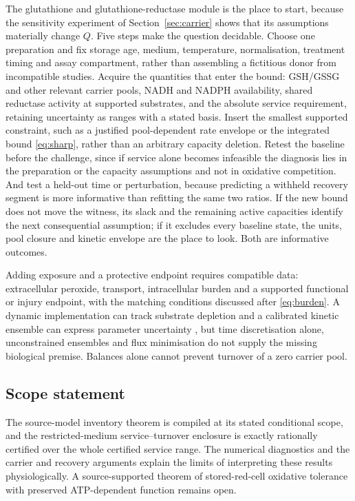 \documentclass[11pt,a4paper]{article}
\theoremstyle{plain}
\theoremstyle{definition}
\theoremstyle{remark}
\begin{document}
The glutathione and glutathione-reductase module is the place to start, because
the sensitivity experiment of Section~\ref{sec:carrier} shows that its
assumptions materially change $Q$. Five steps make the question decidable.
Choose one preparation and fix storage age, medium, temperature, normalisation,
treatment timing and assay compartment, rather than assembling a fictitious
donor from incompatible studies. Acquire the quantities that enter the bound:
GSH/GSSG and other relevant carrier pools, NADH and NADPH availability, shared
reductase activity at supported substrates, and the absolute service
requirement, retaining uncertainty as ranges with a stated basis. Insert the
smallest supported constraint, such as a justified pool-dependent rate envelope
or the integrated bound \eqref{eq:sharp}, rather than an arbitrary capacity
deletion. Retest the baseline before the challenge, since if service alone
becomes infeasible the diagnosis lies in the preparation or the capacity
assumptions and not in oxidative competition. And test a held-out time or
perturbation, because predicting a withheld recovery segment is more
informative than refitting the same two ratios. If the new bound does not move
the witness, its slack and the remaining active capacities identify the next
consequential assumption; if it excludes every baseline state, the units, pool
closure and kinetic envelope are the place to look. Both are informative
outcomes.

Adding exposure and a protective endpoint requires compatible data:
extracellular peroxide, transport, intracellular burden and a supported
functional or injury endpoint, with the matching conditions discussed after
\eqref{eq:burden}. A dynamic implementation can track substrate depletion
\citep{mahadevan2002} and a calibrated kinetic ensemble can express parameter
uncertainty \citep{bordbar2015}, but time discretisation alone, unconstrained
ensembles and flux minimisation do not supply the missing biological premise.
Balances alone cannot prevent turnover of a zero carrier pool.

\subsection{Scope statement}
The source-model inventory theorem is compiled at its stated conditional scope,
and the restricted-medium service--turnover enclosure is exactly rationally
certified over the whole certified service range. The numerical diagnostics and
the carrier and recovery arguments explain the limits of interpreting these
results physiologically. A source-supported theorem of stored-red-cell
oxidative tolerance with preserved ATP-dependent function remains open.
\end{document}
